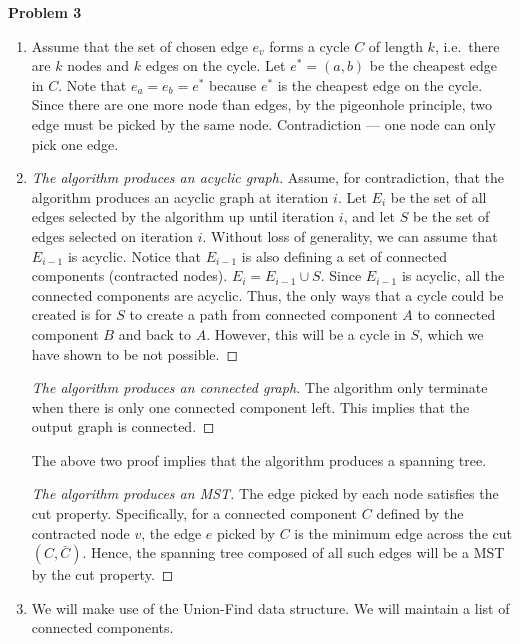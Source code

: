 \documentclass[a4paper]{/home/dawei/.dotfiles/templates/preamble}
\begin{document}
\noindent\textbf{Problem 3}
  \begin{enumerate}[label = (\alph*)]
  \item Assume that the set of chosen edge $e_v$ forms a cycle $C$ of length
    $k$, i.e.\ there are $k$ nodes and $k$ edges on the cycle. Let $e^*
    = (a,b)$ be the cheapest edge in $C$. Note that $e_a = e_b = e^*$ because
    $e^*$ is the cheapest edge on the cycle. Since there are one more node
    than edges, by the pigeonhole principle, two edge must be picked by the
    same node. Contradiction --- one node can only pick one edge.
  \item 
    \begin{proof}[The algorithm produces an acyclic graph]
      Assume, for contradiction, that the algorithm produces an acyclic graph
      at iteration $i$. Let $E_{i}$ be the set of all edges selected by the
      algorithm up until iteration $i$, and let $S$ be the set of edges
      selected on iteration $i$. Without loss of generality, we can assume that
      $E_{i-1}$ is acyclic. Notice that $E_{i-1}$ is also defining a set of
      connected components (contracted nodes). $E_i = E_{i-1} \cup S$. Since
      $E_{i-1}$ is acyclic, all the connected components are acyclic. Thus, the
      only ways that a cycle could be created is for $S$ to create a path from
      connected component $A$ to connected component $B$ and back to $A$.
      However, this will be a cycle in $S$, which we have shown to be not
      possible.
    \end{proof}
    \begin{proof}[The algorithm produces an connected graph]
      The algorithm only terminate when there is only one connected component left.
      This implies that the output graph is connected.
    \end{proof}
    The above two proof implies that the algorithm produces a spanning tree.
    \begin{proof}[The algorithm produces an MST]
      The edge picked by each node satisfies the cut property. Specifically,
      for a connected component $C$ defined by the contracted node $v$, the
      edge $e$ picked by $C$ is the minimum edge across the cut $(C, \bar{C})$.
      Hence, the spanning tree composed of all such edges will be a MST by the
      cut property.
    \end{proof}
  \item We will make use of the Union-Find data structure. We will maintain
    a list of connected components.
    \begin{algorithmic}

\end{algorithmic}
\end{enumerate}
\end{document}
